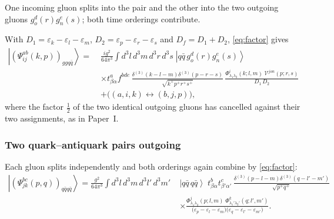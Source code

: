 \documentclass[11pt,a4paper]{article}
\numberwithin{equation}{section}
\newcommand{\eps}{\varepsilon}
\newcommand{\dthree}{\delta^{(3)}}
\newcommand{\ket}[1]{\left|#1\right\rangle}
\newcommand{\Ph}{\Phi}
\newcommand{\Vg}{\mathcal{V}}
\newcommand{\qk}[3]{q^{#1}_{#2}(#3)}
\newcommand{\aqk}[3]{\bar q^{#1}_{#2}(#3)}
\newcommand{\gl}[3]{g^{#1}_{#2}(#3)}
\begin{document}
One incoming gluon splits into the pair and the other into the two outgoing gluons
$\gl{d}{o}{r}\gl{e}{n}{s}$; both time orderings contribute.
\begin{center}
\end{center}
With $D_{1}=\eps_{k}-\eps_{l}-\eps_{m}$, $D_{2}=\eps_{p}-\eps_{r}-\eps_{s}$ and $D_{f}=D_{1}+D_{2}$,
\eqref{eq:factor} gives
\begin{align}
\ket{(\Psi^{ab}_{ij}(k,p))_{ggq\bar q}}=\;&\frac{ig^{2}}{64\pi^{3}}\int\!d^{3}l\,d^{3}m\,d^{3}r\,d^{3}s\;
\ket{q\bar q\,\gl{d}{o}{r}\gl{e}{n}{s}}
\nonumber\\&\times t^{a}_{\beta\alpha}f^{bde}\,
\frac{\dthree(k-l-m)\dthree(p-r-s)}{\sqrt{k^{+}p^{+}r^{+}s^{+}}}\,
\frac{\Ph^{i}_{\lambda_{1}\lambda_{2}}(k;l,m)\;\Vg^{jon}(p;r,s)}{D_{1}\,D_{2}}
\nonumber\\&+\big((a,i,k)\leftrightarrow(b,j,p)\big),
\label{eq:Pggqq}
\end{align}
where the factor $\tfrac12$ of the two identical outgoing gluons has cancelled against their two
assignments, as in Paper~I.

\subsubsection{Two quark--antiquark pairs outgoing}

Each gluon splits independently and both orderings again combine by \eqref{eq:factor}:
\begin{align}
\ket{(\Psi^{bc}_{jk}(p,q))_{q\bar qq\bar q}}=\frac{g^{2}}{64\pi^{3}}
\int\!d^{3}l\,d^{3}m\,d^{3}l'\,d^{3}m'\;
&\ket{q\bar q\,q\bar q}\;t^{b}_{\beta\alpha}t^{c}_{\beta'\alpha'}\,
\frac{\dthree(p-l-m)\dthree(q-l'-m')}{\sqrt{p^{+}q^{+}}}
\nonumber\\&\times
\frac{\Ph^{j}_{\lambda_{1}\lambda_{2}}(p;l,m)\;\Ph^{k}_{\lambda_{1}'\lambda_{2}'}(q;l',m')}
{\big(\eps_{p}-\eps_{l}-\eps_{m}\big)\big(\eps_{q}-\eps_{l'}-\eps_{m'}\big)} .
\label{eq:Pqqqq}
\end{align}
\end{document}
